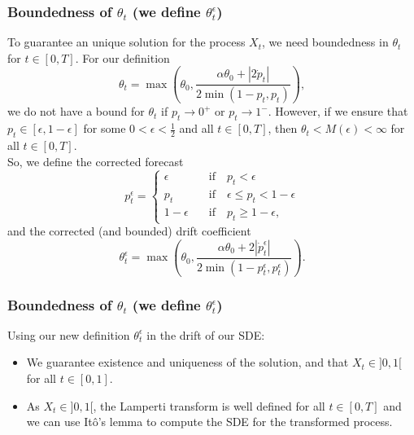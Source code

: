 \documentclass[aspectratio=169]{beamer}\usepackage[utf8]{inputenc}
\begin{document}
\begin{frame}\frametitle{Boundedness of $\theta_t$ (we define $\theta_t^\epsilon$)}\label{theta_t}
To guarantee an unique solution for the process $X_t$, we need boundedness in $\theta_t$ for $t\in[0,T]$. For our definition
\begin{equation}
\theta_t=\max\left(\theta_0,\frac{\alpha\theta_0+|2\dot{p}_t|}{2\min(1-p_t,p_t)}\right),
\label{Eq-6}
\end{equation}
we do not have a bound for $\theta_t$ if $p_t\to0^+$ or $p_t\to1^-$.
However, if we ensure that $p_t\in[\epsilon,1-\epsilon]$ for some $0<\epsilon<\frac{1}{2}$ and all $t\in[0,T]$, then $\theta_t<M(\epsilon)<\infty$ for all $t\in[0,T]$.\\
So, we define the corrected forecast
\begin{equation}
p_t^\epsilon=\begin{cases}
\epsilon\quad&\text{if}\quad p_t<\epsilon\\
p_t\quad&\text{if}\quad\epsilon\leq p_t<1-\epsilon\\
1-\epsilon\quad&\text{if}\quad p_t\geq1-\epsilon,
\end{cases}
\label{Eq-5}
\end{equation}
and the corrected (and bounded) drift coefficient
\begin{equation}
\theta_t^\epsilon=\max\left(\theta_0,\frac{\alpha\theta_0+2|\dot{p}_t^\epsilon|}{2\min(1-p_t^\epsilon,p_t^\epsilon)}\right).
\label{Eq-11}
\end{equation}

\end{frame}


\begin{frame}\frametitle{Boundedness of $\theta_t$ (we define $\theta_t^\epsilon$)}

Using our new definition $\theta_t^\epsilon$ in the drift of our SDE:
\begin{itemize}

\item We guarantee existence and uniqueness of the solution, and that $X_t\in]0,1[$ for all $t\in[0,1]$.
\item As $X_t\in]0,1[$, the Lamperti transform is well defined for all $t\in[0,T]$ and we can use It\^o's lemma to compute the SDE for the transformed process.

\end{itemize}

\end{frame}
\end{document}
